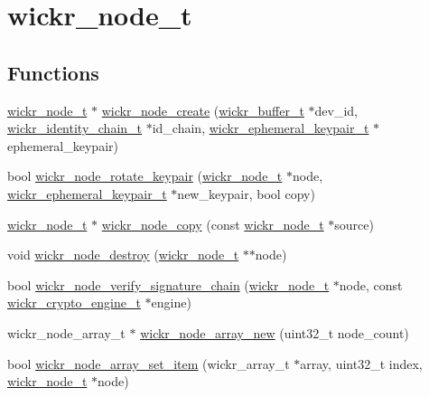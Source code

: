 \hypertarget{group__wickr__node}{}\section{wickr\+\_\+node\+\_\+t}
\label{group__wickr__node}
\subsection*{Functions}
\begin{DoxyCompactItemize}
\item 
\hyperlink{structwickr__node}{wickr\+\_\+node\+\_\+t} $\ast$ \hyperlink{group__wickr__node_ga293b1210648e2db5449be23fe0f3e644}{wickr\+\_\+node\+\_\+create} (\hyperlink{structwickr__buffer}{wickr\+\_\+buffer\+\_\+t} $\ast$dev\+\_\+id, \hyperlink{structwickr__identity__chain}{wickr\+\_\+identity\+\_\+chain\+\_\+t} $\ast$id\+\_\+chain, \hyperlink{structwickr__ephemeral__keypair}{wickr\+\_\+ephemeral\+\_\+keypair\+\_\+t} $\ast$ephemeral\+\_\+keypair)
\item 
bool \hyperlink{group__wickr__node_ga2ed650b947df7316cf0f915805ac5aa4}{wickr\+\_\+node\+\_\+rotate\+\_\+keypair} (\hyperlink{structwickr__node}{wickr\+\_\+node\+\_\+t} $\ast$node, \hyperlink{structwickr__ephemeral__keypair}{wickr\+\_\+ephemeral\+\_\+keypair\+\_\+t} $\ast$new\+\_\+keypair, bool copy)
\item 
\hyperlink{structwickr__node}{wickr\+\_\+node\+\_\+t} $\ast$ \hyperlink{group__wickr__node_ga393c4fb42022fdc6f4336a62dbc7af91}{wickr\+\_\+node\+\_\+copy} (const \hyperlink{structwickr__node}{wickr\+\_\+node\+\_\+t} $\ast$source)
\item 
void \hyperlink{group__wickr__node_ga6acf07885403d9df6baad36a8d797f73}{wickr\+\_\+node\+\_\+destroy} (\hyperlink{structwickr__node}{wickr\+\_\+node\+\_\+t} $\ast$$\ast$node)
\item 
bool \hyperlink{group__wickr__node_gac9e2d96e9109590124b2fd05a8826c1d}{wickr\+\_\+node\+\_\+verify\+\_\+signature\+\_\+chain} (\hyperlink{structwickr__node}{wickr\+\_\+node\+\_\+t} $\ast$node, const \hyperlink{structwickr__crypto__engine}{wickr\+\_\+crypto\+\_\+engine\+\_\+t} $\ast$engine)
\item 
wickr\+\_\+node\+\_\+array\+\_\+t $\ast$ \hyperlink{group__wickr__node_ga504ebe707aa003032c4ac8044d73ee92}{wickr\+\_\+node\+\_\+array\+\_\+new} (uint32\+\_\+t node\+\_\+count)
\item 
bool \hyperlink{group__wickr__node_gae511a75489982fc2e90271be63d9d753}{wickr\+\_\+node\+\_\+array\+\_\+set\+\_\+item} (wickr\+\_\+array\+\_\+t $\ast$array, uint32\+\_\+t index, \hyperlink{structwickr__node}{wickr\+\_\+node\+\_\+t} $\ast$node)
$$
\end{DoxyCompactItemize}
